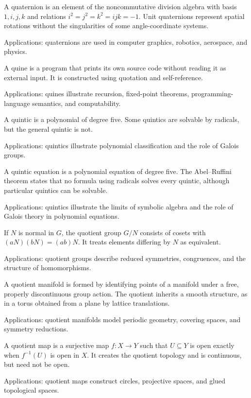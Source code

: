 A quaternion is an element of the noncommutative division algebra with basis $1,i,j,k$ and relations $i^2=j^2=k^2=ijk=-1$. Unit quaternions represent spatial rotations without the singularities of some angle-coordinate systems. \par\noindent Applications: quaternions are used in computer graphics, robotics, aerospace, and physics.

A quine is a program that prints its own source code without reading it as external input. It is constructed using quotation and self-reference. \par\noindent Applications: quines illustrate recursion, fixed-point theorems, programming-language semantics, and computability.

A quintic is a polynomial of degree five. Some quintics are solvable by radicals, but the general quintic is not. \par\noindent Applications: quintics illustrate polynomial classification and the role of Galois groups.

A quintic equation is a polynomial equation of degree five. The Abel--Ruffini theorem states that no formula using radicals solves every quintic, although particular quintics can be solvable. \par\noindent Applications: quintics illustrate the limits of symbolic algebra and the role of Galois theory in polynomial equations.

If $N$ is normal in $G$, the quotient group $G/N$ consists of cosets with $(aN)(bN)=(ab)N$. It treats elements differing by $N$ as equivalent. \par\noindent Applications: quotient groups describe reduced symmetries, congruences, and the structure of homomorphisms.

A quotient manifold is formed by identifying points of a manifold under a free, properly discontinuous group action. The quotient inherits a smooth structure, as in a torus obtained from a plane by lattice translations. \par\noindent Applications: quotient manifolds model periodic geometry, covering spaces, and symmetry reductions.

A quotient map is a surjective map $f:X\to Y$ such that $U\subseteq Y$ is open exactly when $f^{-1}(U)$ is open in $X$. It creates the quotient topology and is continuous, but need not be open. \par\noindent Applications: quotient maps construct circles, projective spaces, and glued topological spaces.

